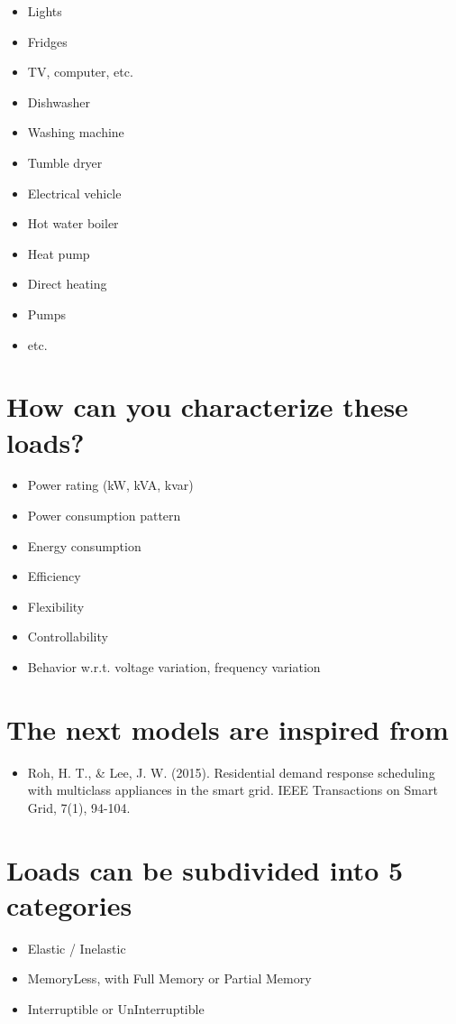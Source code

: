 \documentclass[10pt]{article}
\begin{document}
\begin{itemize}
  \item Lights
  \item Fridges
  \item TV, computer, etc.
  \item Dishwasher
  \item Washing machine
  \item Tumble dryer
  \item Electrical vehicle
  \item Hot water boiler
  \item Heat pump
  \item Direct heating
  \item Pumps
  \item etc.
\end{itemize}

\section*{How can you characterize these loads?}
\begin{itemize}
  \item Power rating (kW, kVA, kvar)
  \item Power consumption pattern
  \item Energy consumption
  \item Efficiency
  \item Flexibility
  \item Controllability
  \item Behavior w.r.t. voltage variation, frequency variation
\end{itemize}

\section*{The next models are inspired from}
\begin{itemize}
  \item Roh, H. T., \& Lee, J. W. (2015). Residential demand response scheduling with multiclass appliances in the smart grid. IEEE Transactions on Smart Grid, 7(1), 94-104.
\end{itemize}

\section*{Loads can be subdivided into 5 categories}
\begin{itemize}
  \item Elastic / Inelastic
  \item MemoryLess, with Full Memory or Partial Memory
  \item Interruptible or UnInterruptible
\end{itemize}
\end{document}
